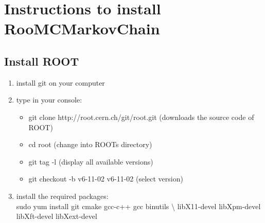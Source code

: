 \documentclass[10pt]{article}
\title{}
\author{Oliver Dahme}
\begin{document}
\maketitle


\section*{Instructions to install RooMCMarkovChain}

\subsection*{Install ROOT}



\begin{enumerate}
 \item install git on your computer \cite{bib:git}
 \item type in your console: \\
       \begin{itemize}
        \item git clone http://root.cern.ch/git/root.git (downloads the source code of ROOT)
        \item cd root (change into ROOTs directory)
        \item git tag -l (display all available versions)
        \item git checkout -b v6-11-02 v6-11-02 (select version)
       \end{itemize}
 \item install the required packages: \\
       sudo yum install git cmake gcc-c++ gcc binutils \textbackslash
       libX11-devel libXpm-devel libXft-devel libXext-devel
\end{enumerate}
\end{document}
